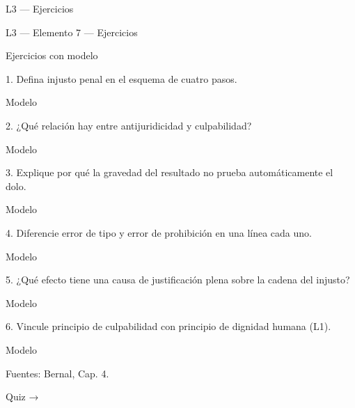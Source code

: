 \documentclass[11pt,a4paper]{article}
\begin{document}
L3 — Ejercicios\par





    L3 — Elemento 7 — Ejercicios\par
    Ejercicios con modelo\par


      1. Defina injusto penal en el esquema de cuatro pasos.\par

      Modelo\par





      2. ¿Qué relación hay entre antijuridicidad y culpabilidad?\par

      Modelo\par





      3. Explique por qué la gravedad del resultado no prueba automáticamente el dolo.\par

      Modelo\par





      4. Diferencie error de tipo y error de prohibición en una línea cada uno.\par

      Modelo\par





      5. ¿Qué efecto tiene una causa de justificación plena sobre la cadena del injusto?\par

      Modelo\par





      6. Vincule principio de culpabilidad con principio de dignidad humana (L1).\par

      Modelo\par




    Fuentes: Bernal, Cap. 4.\par

    Quiz →\par
\end{document}
